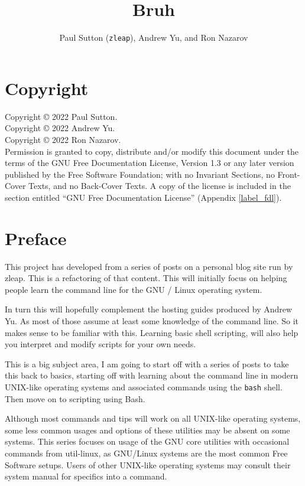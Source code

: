 \documentclass{book}
\title{Bruh}
\author{Paul Sutton (\texttt{zleap}), Andrew Yu, and Ron Nazarov}
\begin{document}
\maketitle

\frontmatter
\chapter{Copyright}

Copyright \copyright{}  2022  Paul Sutton.\\
Copyright \copyright{}  2022  Andrew Yu.\\
Copyright \copyright{}  2022  Ron Nazarov.\\
Permission is granted to copy, distribute and/or modify this document
under the terms of the GNU Free Documentation License, Version 1.3
or any later version published by the Free Software Foundation;
with no Invariant Sections, no Front-Cover Texts, and no Back-Cover Texts.
A copy of the license is included in the section entitled ``GNU
Free Documentation License'' (Appendix \ref{label_fdl}).

\chapter{Preface}

This project has developed from a series of posts on a personal blog site run by zleap. This is a refactoring of that content. This will initially focus on helping people learn the command line for the GNU / Linux operating system.

In turn this will hopefully complement the hosting guides produced by Andrew Yu. As most of those assume at least some knowledge of the command line. So it makes sense to be familiar with this. Learning basic shell scripting, will also help you interpret and modify scripts for your own needs.

This is a big subject area, I am going to start off with a series of posts to take this back to basics, starting off with learning about the command line in modern UNIX-like operating systems and associated commands using the \texttt{bash} shell. Then move on to scripting using Bash.

Although most commands and tips will work on all UNIX-like operating systems, some less common usages and options of these utilities may be absent on some systems. This series focuses on usage of the GNU core utilities with occasional commands from util-linux, as GNU/Linux systems are the most common Free Software setups. Users of other UNIX-like operating systems may consult their system manual for specifics into a command.
\end{document}
